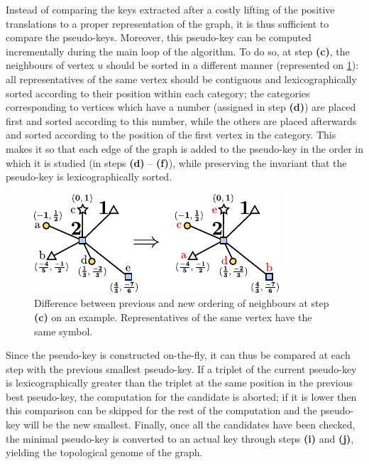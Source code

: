 \documentclass[main.tex]{subfiles}
\begin{document}
Instead of comparing the keys extracted after a costly lifting of the positive translations to a proper representation of the graph, it is thus sufficient to compare the pseudo-keys. Moreover, this pseudo-key can be computed incrementally during the main loop of the algorithm. To do so, at step {\bf (c)}, the neighbours of vertex $u$ should be sorted in a different manner (represented on \cref{neighbourreordering}): all representatives of the same vertex should be contiguous and lexicographically sorted according to their position within each category; the categories corresponding to vertices which have a number (assigned in step {\bf (d)}) are placed first and sorted according to this number, while the others are placed afterwards and sorted according to the position of the first vertex in the category. This makes it so that each edge of the graph is added to the pseudo-key in the order in which it is studied (in steps {\bf (d)} -- {\bf (f)}), while preserving the invariant that the pseudo-key is lexicographically sorted.

\begin{figure}[t]
	\centering
	\includegraphics[width=0.85\linewidth]{figures/topology/pseudokey.pdf}
	\caption{Difference between previous and new ordering of neighbours at step {\bf (c)} on an example. Representatives of the same vertex have the same symbol.}
	\label{neighbourreordering}
\end{figure}

Since the pseudo-key is constructed on-the-fly, it can thus be compared at each step with the previous smallest pseudo-key. If a triplet of the current pseudo-key is lexicographically greater than the triplet at the same position in the previous best pseudo-key, the computation for the candidate is aborted; if it is lower then this comparison can be skipped for the rest of the computation and the pseudo-key will be the new smallest. Finally, once all the candidates have been checked, the minimal pseudo-key is converted to an actual key through steps {\bf (i)} and {\bf (j)}, yielding the topological genome of the graph.
\end{document}
